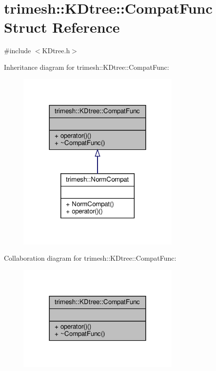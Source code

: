 \hypertarget{structtrimesh_1_1KDtree_1_1CompatFunc}{}\section{trimesh\+:\+:K\+Dtree\+:\+:Compat\+Func Struct Reference}
\label{structtrimesh_1_1KDtree_1_1CompatFunc}


{\ttfamily \#include $<$K\+Dtree.\+h$>$}



Inheritance diagram for trimesh\+:\+:K\+Dtree\+:\+:Compat\+Func\+:\nopagebreak
\begin{figure}[H]
\begin{center}
\leavevmode
\includegraphics[width=228pt]{da/da3/structtrimesh_1_1KDtree_1_1CompatFunc__inherit__graph}
\end{center}
\end{figure}


Collaboration diagram for trimesh\+:\+:K\+Dtree\+:\+:Compat\+Func\+:\nopagebreak
\begin{figure}[H]
\begin{center}
\leavevmode
\includegraphics[width=228pt]{d1/ded/structtrimesh_1_1KDtree_1_1CompatFunc__coll__graph}
\end{center}
\end{figure}
